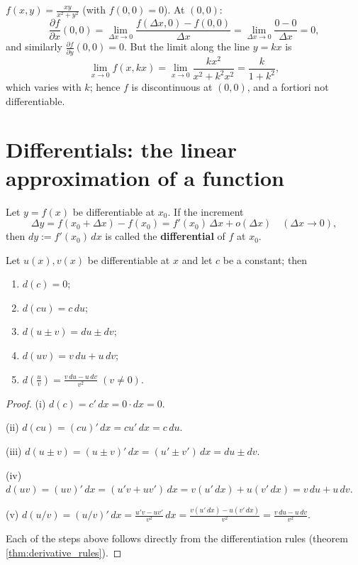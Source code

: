 \begin{remark}\label{rem:partial_not_differentiable}
$f(x,y) = \frac{xy}{x^2+y^2}$ (with $f(0,0)=0$). At $(0,0)$:
\[
\frac{\partial f}{\partial x}(0,0) = \lim_{\Delta x \to 0} \frac{f(\Delta x, 0) - f(0,0)}{\Delta x} = \lim_{\Delta x \to 0} \frac{0 - 0}{\Delta x} = 0,
\]
and similarly $\frac{\partial f}{\partial y}(0,0) = 0$. But the limit along the line $y = kx$ is
\[
\lim_{x \to 0} f(x, kx) = \lim_{x \to 0} \frac{kx^2}{x^2 + k^2x^2} = \frac{k}{1+k^2},
\]
which varies with $k$; hence $f$ is discontinuous at $(0,0)$, and a fortiori not differentiable.
\end{remark}

\section{\texorpdfstring{Differentials: the linear approximation of a function}{Differentials: the linear approximation of a function}}

\begin{definition}\label{def:differential}
Let $y = f(x)$ be differentiable at $x_0$. If the increment
\[\Delta y = f(x_0 + \Delta x) - f(x_0) = f'(x_0)\,\Delta x + o(\Delta x) \quad (\Delta x \to 0),\]
then $dy := f'(x_0)\,dx$ is called the \textbf{differential} of $f$ at $x_0$.
\end{definition}

\begin{lemma}\label{lem:differential_rules}
Let $u(x), v(x)$ be differentiable at $x$ and let $c$ be a constant; then
\begin{enumerate}[label=(\roman*)]
    \item $d(c) = 0$;
    \item $d(cu) = c\,du$;
    \item $d(u \pm v) = du \pm dv$;
    \item $d(uv) = v\,du + u\,dv$;
    \item $d\!\left(\frac{u}{v}\right) = \frac{v\,du - u\,dv}{v^2}\;(v \neq 0)$.
\end{enumerate}
\end{lemma}

\begin{proof}
(i) $d(c) = c'\,dx = 0 \cdot dx = 0$.

(ii) $d(cu) = (cu)'\,dx = cu'\,dx = c\,du$.

(iii) $d(u \pm v) = (u \pm v)'\,dx = (u' \pm v')\,dx = du \pm dv$.

(iv) $d(uv) = (uv)'\,dx = (u'v + uv')\,dx = v(u'\,dx) + u(v'\,dx) = v\,du + u\,dv$.

(v) $d(u/v) = (u/v)'\,dx = \frac{u'v - uv'}{v^2}\,dx = \frac{v(u'\,dx) - u(v'\,dx)}{v^2} = \frac{v\,du - u\,dv}{v^2}$.

Each of the steps above follows directly from the differentiation rules (theorem \ref{thm:derivative_rules}).
\end{proof}

